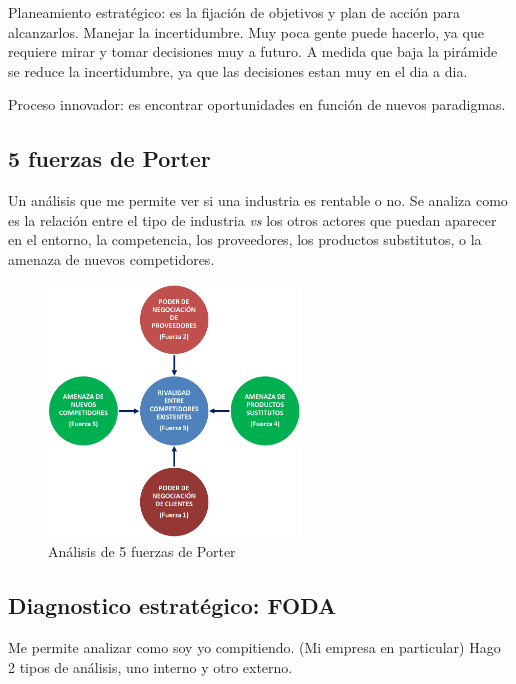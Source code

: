 \documentclass[titlepage,a4paper]{article}
\begin{document}
Planeamiento estratégico: es la fijación de objetivos y plan de acción para alcanzarlos. Manejar la incertidumbre. Muy poca gente puede hacerlo, ya que requiere mirar y tomar decisiones muy a futuro. A medida que baja la pirámide se reduce la incertidumbre, ya que las decisiones estan muy en el dia a dia.

    \smallskip

Proceso innovador: es encontrar oportunidades en función de nuevos paradigmas.

\subsection{5 fuerzas de Porter}
Un análisis que me permite ver si una industria es rentable o no. Se analiza como es la relación entre el tipo de industria \textit{vs} los otros actores que puedan aparecer en el entorno, la competencia, los proveedores, los productos substitutos, o la amenaza de nuevos competidores. 

\begin{figure}[!htb]
    \centering
    \includegraphics[width=0.6\textwidth]{imagenes/5FuerzasPorter.png}
    \caption{Análisis de 5 fuerzas de Porter}
\end{figure}

\newpage 

\subsection{Diagnostico estratégico: FODA}
Me permite analizar como soy yo compitiendo. (Mi empresa en particular) Hago 2 tipos de análisis, uno interno y otro externo.
\end{document}
